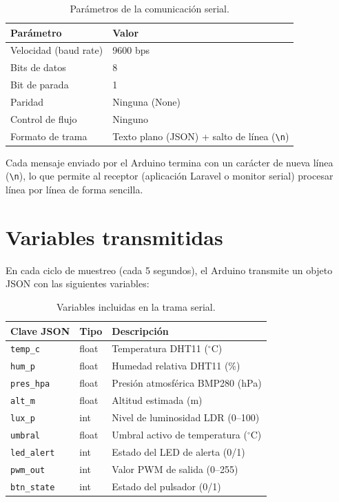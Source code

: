 \begin{table}[H]
\centering
\caption{Parámetros de la comunicación serial.}
\label{tab:serial-params}
\begin{tabular}{@{}ll@{}}
\toprule
\textbf{Parámetro} & \textbf{Valor} \\
\midrule
Velocidad (baud rate) & 9600 bps \\
Bits de datos & 8 \\
Bit de parada & 1 \\
Paridad & Ninguna (None) \\
Control de flujo & Ninguno \\
Formato de trama & Texto plano (JSON) + salto de línea (\texttt{\textbackslash n}) \\
\bottomrule
\end{tabular}
\end{table}

Cada mensaje enviado por el Arduino termina con un carácter de nueva línea (\texttt{\textbackslash n}), lo que permite al receptor (aplicación Laravel o monitor serial) procesar línea por línea de forma sencilla.

\section{Variables transmitidas}

En cada ciclo de muestreo (cada 5 segundos), el Arduino transmite un objeto JSON con las siguientes variables:

\begin{table}[H]
\centering
\caption{Variables incluidas en la trama serial.}
\label{tab:variables-tx}
\begin{tabular}{@{}lll@{}}
\toprule
\textbf{Clave JSON} & \textbf{Tipo} & \textbf{Descripción} \\
\midrule
\texttt{temp\_c} & float & Temperatura DHT11 ($^\circ$C) \\
\texttt{hum\_p} & float & Humedad relativa DHT11 (\%) \\
\texttt{pres\_hpa} & float & Presión atmosférica BMP280 (hPa) \\
\texttt{alt\_m} & float & Altitud estimada (m) \\
\texttt{lux\_p} & int & Nivel de luminosidad LDR (0--100) \\
\texttt{umbral} & float & Umbral activo de temperatura ($^\circ$C) \\
\texttt{led\_alert} & int & Estado del LED de alerta (0/1) \\
\texttt{pwm\_out} & int & Valor PWM de salida (0--255) \\
\texttt{btn\_state} & int & Estado del pulsador (0/1) \\
\bottomrule
\end{tabular}
\end{table}

